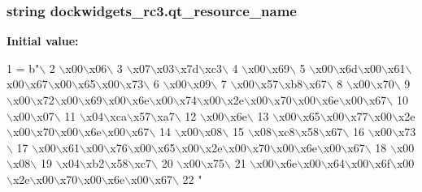 \subsubsection[{qt\+\_\+resource\+\_\+name}]{\setlength{\rightskip}{0pt plus 5cm}string dockwidgets\+\_\+rc3.\+qt\+\_\+resource\+\_\+name}\label{namespacedockwidgets__rc3_a4b969235d49032edb769eb3e8bb46995}
{\bfseries Initial value\+:}
\begin{DoxyCode}
1 = b\textcolor{stringliteral}{"\(\backslash\)}
2 \textcolor{stringliteral}{\(\backslash\)x00\(\backslash\)x06\(\backslash\)}
3 \textcolor{stringliteral}{\(\backslash\)x07\(\backslash\)x03\(\backslash\)x7d\(\backslash\)xc3\(\backslash\)}
4 \textcolor{stringliteral}{\(\backslash\)x00\(\backslash\)x69\(\backslash\)}
5 \textcolor{stringliteral}{\(\backslash\)x00\(\backslash\)x6d\(\backslash\)x00\(\backslash\)x61\(\backslash\)x00\(\backslash\)x67\(\backslash\)x00\(\backslash\)x65\(\backslash\)x00\(\backslash\)x73\(\backslash\)}
6 \textcolor{stringliteral}{\(\backslash\)x00\(\backslash\)x09\(\backslash\)}
7 \textcolor{stringliteral}{\(\backslash\)x00\(\backslash\)x57\(\backslash\)xb8\(\backslash\)x67\(\backslash\)}
8 \textcolor{stringliteral}{\(\backslash\)x00\(\backslash\)x70\(\backslash\)}
9 \textcolor{stringliteral}{\(\backslash\)x00\(\backslash\)x72\(\backslash\)x00\(\backslash\)x69\(\backslash\)x00\(\backslash\)x6e\(\backslash\)x00\(\backslash\)x74\(\backslash\)x00\(\backslash\)x2e\(\backslash\)x00\(\backslash\)x70\(\backslash\)x00\(\backslash\)x6e\(\backslash\)x00\(\backslash\)x67\(\backslash\)}
10 \textcolor{stringliteral}{\(\backslash\)x00\(\backslash\)x07\(\backslash\)}
11 \textcolor{stringliteral}{\(\backslash\)x04\(\backslash\)xca\(\backslash\)x57\(\backslash\)xa7\(\backslash\)}
12 \textcolor{stringliteral}{\(\backslash\)x00\(\backslash\)x6e\(\backslash\)}
13 \textcolor{stringliteral}{\(\backslash\)x00\(\backslash\)x65\(\backslash\)x00\(\backslash\)x77\(\backslash\)x00\(\backslash\)x2e\(\backslash\)x00\(\backslash\)x70\(\backslash\)x00\(\backslash\)x6e\(\backslash\)x00\(\backslash\)x67\(\backslash\)}
14 \textcolor{stringliteral}{\(\backslash\)x00\(\backslash\)x08\(\backslash\)}
15 \textcolor{stringliteral}{\(\backslash\)x08\(\backslash\)xc8\(\backslash\)x58\(\backslash\)x67\(\backslash\)}
16 \textcolor{stringliteral}{\(\backslash\)x00\(\backslash\)x73\(\backslash\)}
17 \textcolor{stringliteral}{\(\backslash\)x00\(\backslash\)x61\(\backslash\)x00\(\backslash\)x76\(\backslash\)x00\(\backslash\)x65\(\backslash\)x00\(\backslash\)x2e\(\backslash\)x00\(\backslash\)x70\(\backslash\)x00\(\backslash\)x6e\(\backslash\)x00\(\backslash\)x67\(\backslash\)}
18 \textcolor{stringliteral}{\(\backslash\)x00\(\backslash\)x08\(\backslash\)}
19 \textcolor{stringliteral}{\(\backslash\)x04\(\backslash\)xb2\(\backslash\)x58\(\backslash\)xc7\(\backslash\)}
20 \textcolor{stringliteral}{\(\backslash\)x00\(\backslash\)x75\(\backslash\)}
21 \textcolor{stringliteral}{\(\backslash\)x00\(\backslash\)x6e\(\backslash\)x00\(\backslash\)x64\(\backslash\)x00\(\backslash\)x6f\(\backslash\)x00\(\backslash\)x2e\(\backslash\)x00\(\backslash\)x70\(\backslash\)x00\(\backslash\)x6e\(\backslash\)x00\(\backslash\)x67\(\backslash\)}
22 \textcolor{stringliteral}{"}
\end{DoxyCode}
